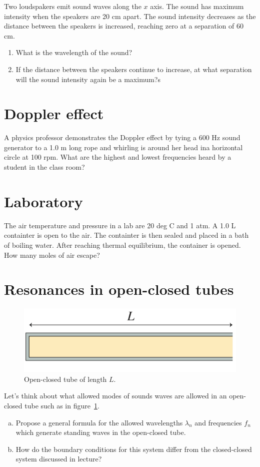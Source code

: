 \documentclass[12pt]{article}
\begin{document}
Two loudspakers emit sound waves along the $x$ axis. The sound has maximum intensity when the speakers are 20 cm apart. The sound intensity decreases as the distance between the speakers is increased, reaching zero at a separation of 60 cm.

\begin{enumerate}
\item What is the wavelength of the sound?
\item If the distance between the speakers continue to increase, at what separation will the sound intensity again be a maximum?s
\end{enumerate}


\newpage
\section{Doppler effect}

A physics professor demonstrates the Doppler effect by tying a 600 Hz sound generator to a 1.0 m long rope and whirling is around her head ina horizontal circle at 100 rpm. What are the highest and lowest frequencies heard by a student in the class room?

\newpage
\section{Laboratory}

The air temperature and pressure in a lab are 20 deg C and 1 atm. A 1.0 L containter is open to the air. The containter is then sealed and placed in a bath of boiling water. After reaching thermal equilibrium, the container is opened. How many moles of air escape?



\newpage
\section{Resonances in open-closed tubes}

\begin{figure}[h!]
\centering
\includegraphics[width=.4\linewidth]{PSet5_Fig1}
\caption{Open-closed tube of length $L$.\label{tube}}
\end{figure}
\noindent
Let's think about what allowed modes of sounds waves are allowed in an open-closed tube such as in figure~\ref{tube}.
\begin{enumerate}[(a)]
\item Propose a general formula for the allowed wavelengths $\lambda_n$ and frequencies $f_n$ which generate standing waves in the open-closed tube.
\item How do the boundary conditions for this system differ from the closed-closed system discussed in lecture?
\end{enumerate}
\end{document}

